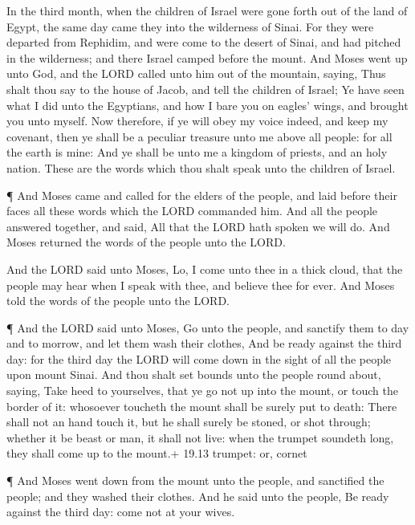  In the third month, when the children of Israel were gone
forth out of the land of Egypt, the same day came they into the
wilderness of Sinai.  For they were departed from Rephidim,
and were come to the desert of Sinai, and had pitched in the wilderness;
and there Israel camped before the mount.  And Moses went up
unto God, and the LORD called unto him out of the mountain, saying, Thus
shalt thou say to the house of Jacob, and tell the children of Israel;
 Ye have seen what I did unto the Egyptians, and how I bare
you on eagles' wings, and brought you unto myself.  Now
therefore, if ye will obey my voice indeed, and keep my covenant, then
ye shall be a peculiar treasure unto me above all people: for all the
earth is mine:  And ye shall be unto me a kingdom of
priests, and an holy nation. These are the words which thou shalt speak
unto the children of Israel.

 ¶ And Moses came and called for the elders of the people,
and laid before their faces all these words which the LORD commanded
him.  And all the people answered together, and said, All
that the LORD hath spoken we will do. And Moses returned the words of
the people unto the LORD.

 And the LORD said unto Moses, Lo, I come unto thee in a
thick cloud, that the people may hear when I speak with thee, and
believe thee for ever. And Moses told the words of the people unto the
LORD.

 ¶ And the LORD said unto Moses, Go unto the people, and
sanctify them to day and to morrow, and let them wash their clothes,
 And be ready against the third day: for the third day the
LORD will come down in the sight of all the people upon mount Sinai.
 And thou shalt set bounds unto the people round about,
saying, Take heed to yourselves, that ye go not up into the mount, or
touch the border of it: whosoever toucheth the mount shall be surely put
to death:  There shall not an hand touch it, but he shall
surely be stoned, or shot through; whether it be beast or man, it shall
not live: when the trumpet soundeth long, they shall come up to the
mount.+ 19.13 trumpet: or, cornet

 ¶ And Moses went down from the mount unto the people, and
sanctified the people; and they washed their clothes.  And
he said unto the people, Be ready against the third day: come not at
your wives.


